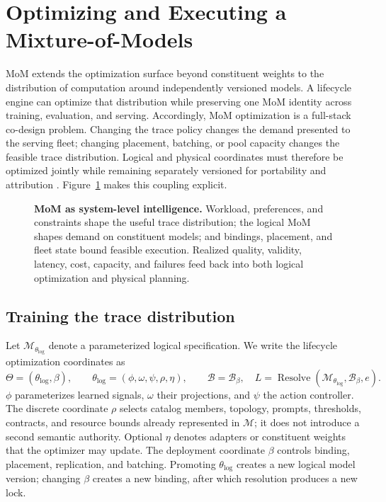 \section{Optimizing and Executing a Mixture-of-Models}
\label{sec:optimization}

MoM extends the optimization surface beyond constituent weights to the
distribution of computation around independently versioned models. A lifecycle
engine can optimize that distribution while preserving one MoM identity across
training, evaluation, and serving. Accordingly, MoM optimization is a
full-stack co-design problem. Changing the trace policy changes the demand
presented to the serving fleet; changing placement, batching, or pool capacity
changes the feasible trace distribution. Logical and physical coordinates must
therefore be optimized jointly while remaining separately versioned for
portability and attribution \citep{chen_2026_wrp}. Figure~\ref{fig:system-codesign}
makes this coupling explicit.

\begin{figure}[H]
  \centering
  \resizebox{\linewidth}{!}{}
  \caption{\textbf{MoM as system-level intelligence.} Workload, preferences,
  and constraints shape the useful trace distribution; the logical MoM shapes
  demand on constituent models; and bindings, placement, and fleet state bound
  feasible execution. Realized quality, validity, latency, cost, capacity, and
  failures feed back into both logical optimization and physical planning.}
  \label{fig:system-codesign}
\end{figure}

\subsection{Training the trace distribution}

Let $\mathcal{M}_{\theta_{\mathrm{log}}}$ denote a parameterized logical
specification. We write the lifecycle optimization coordinates as
\begin{equation}
 \Theta=(\theta_{\mathrm{log}},\beta),\qquad
 \theta_{\mathrm{log}}=(\phi,\omega,\psi,\rho,\eta),\qquad
 \mathcal{B}=\mathcal{B}_{\beta},\quad
 L=\operatorname{Resolve}(\mathcal{M}_{\theta_{\mathrm{log}}},
                           \mathcal{B}_{\beta},e).
 \label{eq:trainable-surface}
\end{equation}
$\phi$ parameterizes learned signals, $\omega$ their projections, and $\psi$
the action controller. The discrete coordinate $\rho$ selects catalog members,
topology, prompts, thresholds, contracts, and resource bounds already represented
in $\mathcal{M}$; it does not introduce a second semantic authority. Optional
$\eta$ denotes adapters or constituent weights that the optimizer may update.
The deployment coordinate $\beta$ controls binding, placement, replication, and
batching. Promoting $\theta_{\mathrm{log}}$ creates a new logical model version;
changing $\beta$ creates a new binding, after which resolution produces a new
lock.

